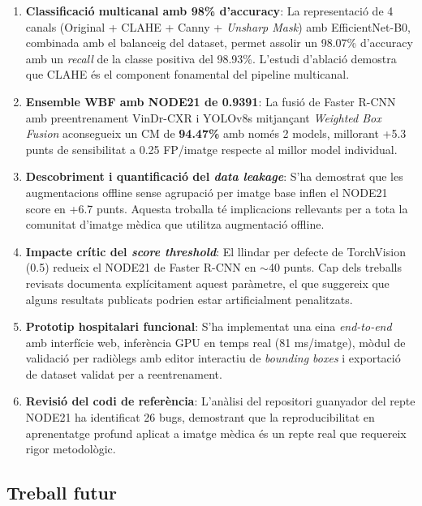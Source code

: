 \begin{enumerate}
    \item \textbf{Classificació multicanal amb 98\% d'accuracy}: La representació de 4 canals (Original + CLAHE + Canny + \textit{Unsharp Mask}) amb EfficientNet-B0, combinada amb el balanceig del dataset, permet assolir un 98.07\% d'accuracy amb un \textit{recall} de la classe positiva del 98.93\%. L'estudi d'ablació demostra que CLAHE és el component fonamental del pipeline multicanal.

    \item \textbf{Ensemble WBF amb NODE21 de 0.9391}: La fusió de Faster R-CNN amb preentrenament VinDr-CXR i YOLOv8s mitjançant \textit{Weighted Box Fusion} aconsegueix un CM de \textbf{94.47\%} amb només 2 models, millorant +5.3 punts de sensibilitat a 0.25 FP/imatge respecte al millor model individual.

    \item \textbf{Descobriment i quantificació del \textit{data leakage}}: S'ha demostrat que les augmentacions offline sense agrupació per imatge base inflen el NODE21 score en +6.7 punts. Aquesta troballa té implicacions rellevants per a tota la comunitat d'imatge mèdica que utilitza augmentació offline.

    \item \textbf{Impacte crític del \textit{score threshold}}: El llindar per defecte de TorchVision (0.5) redueix el NODE21 de Faster R-CNN en $\sim$40 punts. Cap dels treballs revisats documenta explícitament aquest paràmetre, el que suggereix que alguns resultats publicats podrien estar artificialment penalitzats.

    \item \textbf{Prototip hospitalari funcional}: S'ha implementat una eina \textit{end-to-end} amb interfície web, inferència GPU en temps real (81 ms/imatge), mòdul de validació per radiòlegs amb editor interactiu de \textit{bounding boxes} i exportació de dataset validat per a reentrenament.

    \item \textbf{Revisió del codi de referència}: L'anàlisi del repositori guanyador del repte NODE21 ha identificat 26 bugs, demostrant que la reproducibilitat en aprenentatge profund aplicat a imatge mèdica és un repte real que requereix rigor metodològic.
\end{enumerate}

\subsection{Treball futur}

